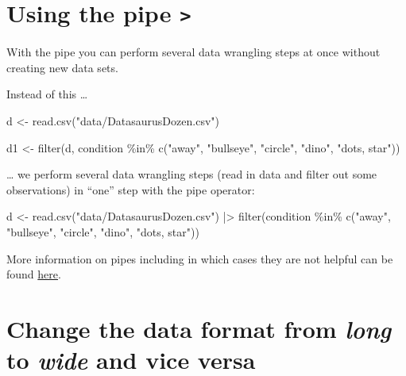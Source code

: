 \documentclass[
  letterpaper,
  DIV=11,
  numbers=noendperiod,
  oneside]{scrreprt}
\newenvironment{Shaded}{\begin{snugshade}}{\end{snugshade}}
\newcommand{\FunctionTok}[1]{\textcolor[rgb]{0.28,0.35,0.67}{#1}}
\newcommand{\NormalTok}[1]{\textcolor[rgb]{0.00,0.23,0.31}{#1}}
\newcommand{\OtherTok}[1]{\textcolor[rgb]{0.00,0.23,0.31}{#1}}
\newcommand{\SpecialCharTok}[1]{\textcolor[rgb]{0.37,0.37,0.37}{#1}}
\newcommand{\StringTok}[1]{\textcolor[rgb]{0.13,0.47,0.30}{#1}}
\begin{document}
\hypertarget{using-the-pipe}{%
\section{\texorpdfstring{Using the pipe
\texttt{\textbar{}\textgreater{}}}{Using the pipe \textbar\textgreater{}}}\label{using-the-pipe}}

With the pipe you can perform several data wrangling steps at once
without creating new data sets.

Instead of this \ldots{}

\begin{Shaded}
\begin{Highlighting}[]
\NormalTok{d }\OtherTok{\textless{}{-}} \FunctionTok{read.csv}\NormalTok{(}\StringTok{"data/DatasaurusDozen.csv"}\NormalTok{)}

\NormalTok{d1 }\OtherTok{\textless{}{-}} \FunctionTok{filter}\NormalTok{(d, condition }\SpecialCharTok{\%in\%} \FunctionTok{c}\NormalTok{(}\StringTok{"away"}\NormalTok{, }\StringTok{"bullseye"}\NormalTok{, }\StringTok{"circle"}\NormalTok{, }\StringTok{"dino"}\NormalTok{, }\StringTok{"dots, star"}\NormalTok{))}
\end{Highlighting}
\end{Shaded}

\ldots{} we perform several data wrangling steps (read in data and
filter out some observations) in ``one'' step with the pipe operator:

\begin{Shaded}
\begin{Highlighting}[]
\NormalTok{d }\OtherTok{\textless{}{-}} \FunctionTok{read.csv}\NormalTok{(}\StringTok{"data/DatasaurusDozen.csv"}\NormalTok{) }\SpecialCharTok{|\textgreater{}}
    \FunctionTok{filter}\NormalTok{(condition }\SpecialCharTok{\%in\%} \FunctionTok{c}\NormalTok{(}\StringTok{"away"}\NormalTok{, }\StringTok{"bullseye"}\NormalTok{, }\StringTok{"circle"}\NormalTok{, }\StringTok{"dino"}\NormalTok{, }\StringTok{"dots, star"}\NormalTok{))}
\end{Highlighting}
\end{Shaded}

More information on pipes including in which cases they are not helpful
can be found
\href{https://r4ds.had.co.nz/pipes.html\#when-not-to-use-the-pipe}{here}.

\hypertarget{change-the-data-format-from-long-to-wide-and-vice-versa}{%
\section{\texorpdfstring{Change the data format from \emph{long} to
\emph{wide} and vice
versa}{Change the data format from long to wide and vice versa}}\label{change-the-data-format-from-long-to-wide-and-vice-versa}}
\end{document}
